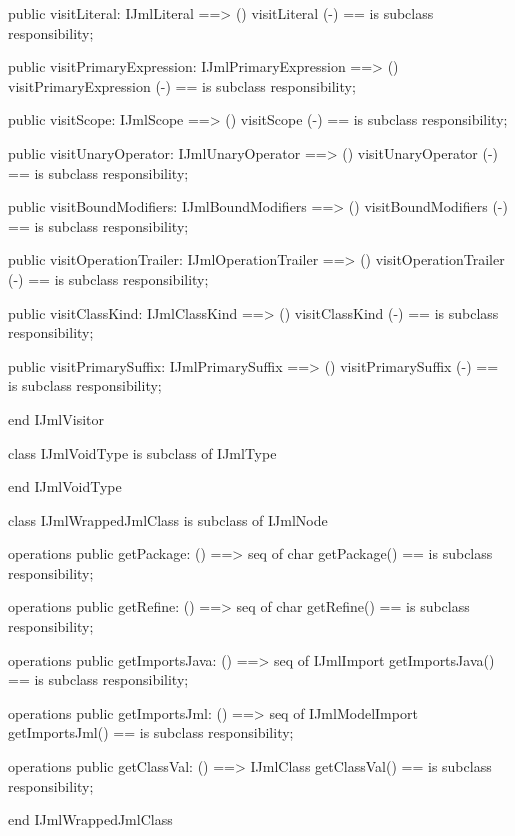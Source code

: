 \begin{vdm_al}
  public visitLiteral: IJmlLiteral ==> ()
  visitLiteral (-) == is subclass responsibility;

  public visitPrimaryExpression: IJmlPrimaryExpression ==> ()
  visitPrimaryExpression (-) == is subclass responsibility;

  public visitScope: IJmlScope ==> ()
  visitScope (-) == is subclass responsibility;

  public visitUnaryOperator: IJmlUnaryOperator ==> ()
  visitUnaryOperator (-) == is subclass responsibility;

  public visitBoundModifiers: IJmlBoundModifiers ==> ()
  visitBoundModifiers (-) == is subclass responsibility;

  public visitOperationTrailer: IJmlOperationTrailer ==> ()
  visitOperationTrailer (-) == is subclass responsibility;

  public visitClassKind: IJmlClassKind ==> ()
  visitClassKind (-) == is subclass responsibility;

  public visitPrimarySuffix: IJmlPrimarySuffix ==> ()
  visitPrimarySuffix (-) == is subclass responsibility;

end IJmlVisitor
\end{vdm_al}

\begin{vdm_al}
class IJmlVoidType
 is subclass of IJmlType

end IJmlVoidType
\end{vdm_al}

\begin{vdm_al}
class IJmlWrappedJmlClass
 is subclass of IJmlNode

operations
  public getPackage: () ==> seq of char
  getPackage() == is subclass responsibility;

operations
  public getRefine: () ==> seq of char
  getRefine() == is subclass responsibility;

operations
  public getImportsJava: () ==> seq of IJmlImport
  getImportsJava() == is subclass responsibility;

operations
  public getImportsJml: () ==> seq of IJmlModelImport
  getImportsJml() == is subclass responsibility;

operations
  public getClassVal: () ==> IJmlClass
  getClassVal() == is subclass responsibility;

end IJmlWrappedJmlClass
\end{vdm_al}

